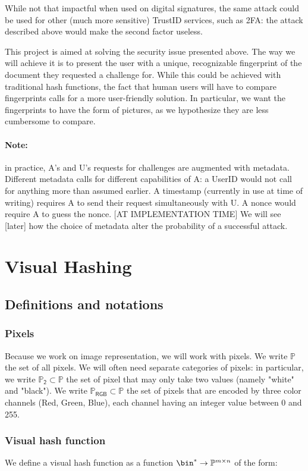 \documentclass{article}
\newcommand{\bb}{\mathbb}
\newcommand{\prgb}{\bb P _\mathsf{RGB}}
\newcommand{\pb}{\bb P _ \mathsf{2}}
\newcommand{\pp}{\bb P}
\newcommand{\pmn}{\pp^{m \times n}}
\begin{document}
While not that impactful when used on digital signatures, the same attack could be used for other (much more sensitive) TrustID services, such as 2FA: the attack described above would make the second factor useless. 

This project is aimed at solving the security issue presented above. The way we will achieve it is to present the user with a unique, recognizable fingerprint of the document they requested a challenge for. While this could be achieved with traditional hash functions, the fact that human users will have to compare fingerprints calls for a more user-friendly solution. In particular, we want the fingerprints to have the form of pictures, as we hypothesize they are
less cumbersome to compare.

\paragraph{Note:} in practice, A's and U's requests for challenges are augmented with metadata. Different metadata calls for different capabilities of A: a UserID would not call for anything more than assumed earlier. A timestamp (currently in use at time of writing) requires A to send their request simultaneously with U. A nonce would require A to guess the nonce. [AT IMPLEMENTATION TIME] We will see [later] how the choice of metadata alter the probability of a successful attack.

\section{Visual Hashing}

\subsection{Definitions and notations}
\subsubsection{Pixels}
Because we work on image representation, we will work with pixels. We write $\pp$ the set of all pixels. We will often need separate categories of pixels: in particular, we write $\pb \subset \mathbb P$ the set of pixel that may only take two values (namely "white" and "black"). We write $ \prgb \subset \pp$ the set of pixels that are encoded by three color channels (Red, Green, Blue), each channel having an integer value between 0 and 255.
\subsubsection{Visual hash function}
We define a visual hash function as a function $\bin^* \rightarrow \pmn$ of the form: 
\end{document}
